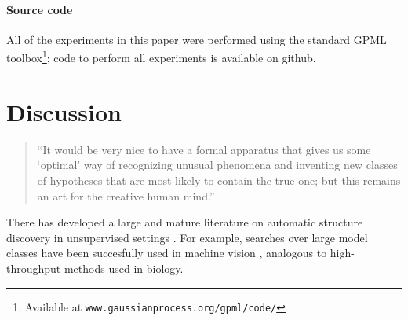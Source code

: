 \documentclass[twoside]{article}
\begin{document}
{\paragraph{Source code}All of the experiments in this paper were performed using the standard GPML toolbox\footnote{Available at \texttt{www.gaussianprocess.org/gpml/code/}}; code to perform all experiments is available on github.








\section{Discussion}

\begin{quotation}
``It would be very nice to have a formal apparatus that gives us some ‘optimal’ way of recognizing unusual phenomena and inventing new classes of hypotheses that are most likely to contain the true one; but this remains an art for the creative human mind.''

\hspace*{\fill}\citet{Jaynes85highlyinformative}


\end{quotation}

There has developed a large and mature literature on automatic structure discovery in unsupervised settings .  
For example, searches over large model classes have been succesfully used in machine vision \cite{pinto2009high}, analogous to high-throughput methods used in biology.

}
\end{document}
